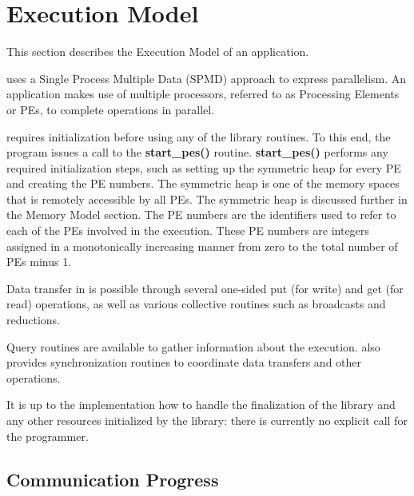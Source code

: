 \section{Execution Model}

This section describes the Execution Model of an \openshmem application.

\openshmem uses a Single Process Multiple Data (SPMD) approach to express
parallelism. An \openshmem application makes use of multiple processors,
referred to as Processing Elements or PEs, to complete operations
in parallel.


\openshmem requires initialization before using any of the library
routines. To this end, the program issues a call to the \textbf{start\_pes()}
routine. \textbf{start\_pes()} performs any required initialization
steps, such as setting up the symmetric heap for every PE and creating
the PE numbers. The symmetric heap is one of the memory spaces
that is remotely accessible by all PEs. The symmetric heap is discussed
further in the Memory Model section. The PE numbers are the
identifiers used to refer to each of the PEs involved in the execution.
These PE numbers are integers assigned in a monotonically
increasing manner from zero to the total number of PEs minus 1.

Data transfer in \openshmem is possible through several one-sided put
(for write) and get (for read) operations, as well as various collective
routines such as broadcasts and reductions.

Query routines are available to gather information about the execution.
\openshmem also provides synchronization routines to coordinate data
transfers and other operations. 

It is up to the implementation how to handle the finalization of the
\openshmem library and any other resources initialized by the library:
there is currently no explicit call for the programmer.

\subsection{Communication Progress}

